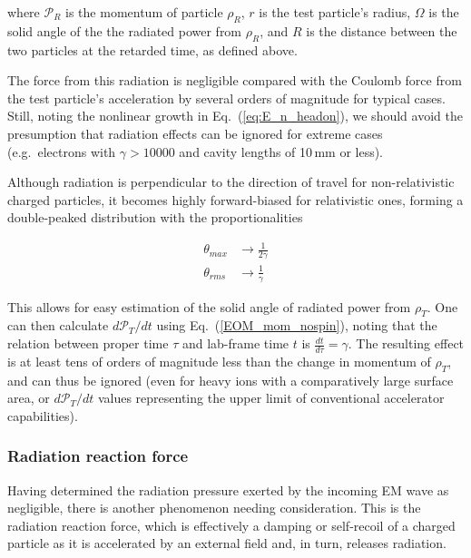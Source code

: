 \documentclass[reprint,
               amsmath,amssymb,nofootinbib, aps%
              ]{revtex4-2}
\begin{document}
\noindent where $\mathcal{P}_R$ is the momentum of particle $\rho_R$, $r$ is the test particle's radius, $\Omega$ is the solid angle of the the radiated power from $\rho_R$, and $R$ is the distance between the two particles at the retarded time, as defined above.

The force from this radiation is negligible compared with the Coulomb force from the test particle's acceleration by several orders of magnitude for typical cases. Still, noting the nonlinear growth in Eq.~(\ref{eq:E_n_headon}), we should avoid the presumption that radiation effects can be ignored for extreme cases (e.g.~electrons with $\gamma>10000$ and cavity lengths of 10\,mm or less).

Although radiation is perpendicular to the direction of travel for non-relativistic charged particles, it becomes highly forward-biased for relativistic ones, forming a double-peaked distribution with the proportionalities

\vspace{-0.2cm}
\begin{align}
    \label{radiation_max}
    \theta_{max}&\rightarrow \frac{1}{2 \gamma} 
    \\
    \theta_{rms}&\rightarrow \frac{1}{\gamma}
\end{align}

This allows for easy estimation of the solid angle of radiated power from $\rho_T$. One can then calculate $d\mathcal{P}_T / dt$ using Eq.~(\ref{EOM_mom_nospin}), noting that the relation between proper time $\tau$ and lab-frame time $t$ is $\frac{dt}{d \tau}=\gamma$. The resulting effect is at least tens of orders of magnitude less than the change in momentum of $\rho_T$, and can thus be ignored (even for heavy ions with a comparatively large surface area, or $d\mathcal{P}_T / dt$ values representing the upper limit of conventional accelerator capabilities).
\vspace{-0.2cm}
\subsubsection*{Radiation reaction force}
\vspace{-0.2cm}
Having determined the radiation pressure exerted by the incoming EM wave as negligible, there is another phenomenon needing consideration. This is the radiation reaction force, which is effectively a damping or self-recoil of a charged particle as it is accelerated by an external field and, in turn, releases radiation.
\end{document}
